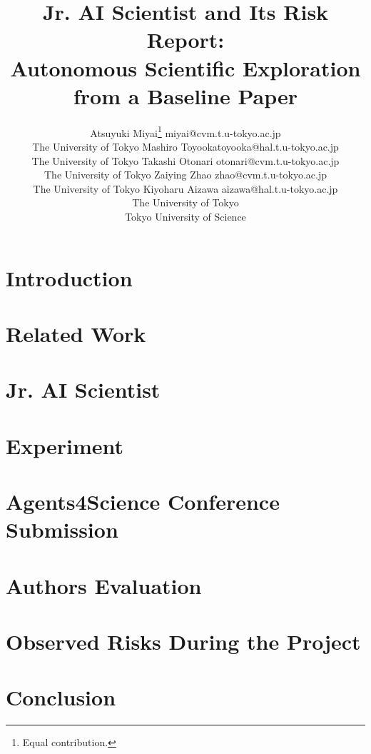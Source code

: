 \documentclass[10pt]{article} %
\title{Jr. AI Scientist and Its Risk Report: \\
Autonomous Scientific Exploration from a Baseline Paper}
\author{%
\name Atsuyuki Miyai\thanks{Equal contribution.} \email miyai@cvm.t.u-tokyo.ac.jp \\
\addr The University of Tokyo
\AND
\name Mashiro Toyooka\footnotemark[1] \email toyooka@hal.t.u-tokyo.ac.jp \\
\addr The University of Tokyo
\AND
\name Takashi Otonari \email otonari@cvm.t.u-tokyo.ac.jp \\
\addr The University of Tokyo
\AND
\name Zaiying Zhao \email zhao@cvm.t.u-tokyo.ac.jp \\
\addr The University of Tokyo
\AND
\name Kiyoharu Aizawa \email aizawa@hal.t.u-tokyo.ac.jp \\
\addr The University of Tokyo \\
  Tokyo University of Science
}
\begin{document}
\maketitle




\begin{abstract}

\end{abstract}

\section{Introduction}


\section{Related Work}


\section{Jr. AI Scientist}



\section{Experiment}


\section{Agents4Science Conference Submission}
\label{sec:Agents4Science}



\section{Authors Evaluation}



\section{Observed Risks During the Project}



\section{Conclusion}






\clearpage

\end{document}
